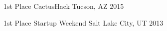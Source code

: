 



\begin{cvhonors}

  \cvhonor
    {1st Place} %
    {CactusHack} %
    {Tucson, AZ} %
    {2015} %

  \cvhonor
    {1st Place} %
    {Startup Weekend} %
    {Salt Lake City, UT} %
    {2013} %

\end{cvhonors}
